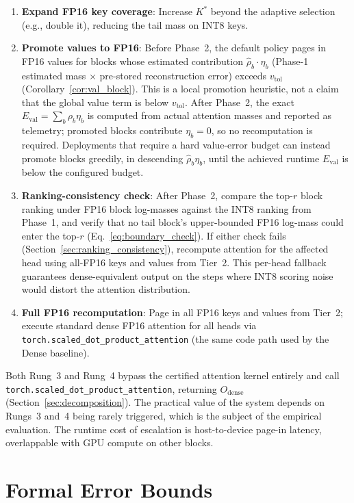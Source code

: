\documentclass[11pt,a4paper]{article}
\theoremstyle{definition}
\theoremstyle{remark}
\newcommand{\torchsdpa}{\texttt{torch.scaled\_dot\_\hspace{0pt}product\_attention}}
\begin{document}
\begin{enumerate}[leftmargin=2em,itemsep=2pt]
  \item \textbf{Expand FP16 key coverage}: Increase $K^*$ beyond the adaptive selection (e.g., double it), reducing the tail mass on INT8 keys.
  \item \textbf{Promote values to FP16}: Before Phase~2, the default policy pages in FP16 values for blocks whose estimated contribution $\hat{\rho}_b \cdot \eta_b$ (Phase-1 estimated mass $\times$ pre-stored reconstruction error) exceeds $v_{\mathrm{tol}}$ (Corollary~\ref{cor:val_block}).  This is a local promotion heuristic, not a claim that the global value term is below $v_{\mathrm{tol}}$.  After Phase~2, the exact $E_{\mathrm{val}} = \sum_b \rho_b \eta_b$ is computed from actual attention masses and reported as telemetry; promoted blocks contribute $\eta_b{=}0$, so no recomputation is required.  Deployments that require a hard value-error budget can instead promote blocks greedily, in descending $\hat{\rho}_b\eta_b$, until the achieved runtime $E_{\mathrm{val}}$ is below the configured budget.
  \item \textbf{Ranking-consistency check}: After Phase~2, compare the top-$r$ block ranking under FP16 block log-masses against the INT8 ranking from Phase~1, and verify that no tail block's upper-bounded FP16 log-mass could enter the top-$r$ (Eq.~\ref{eq:boundary_check}).  If either check fails (Section~\ref{sec:ranking_consistency}), recompute attention for the affected head using all-FP16 keys and values from Tier~2.  This per-head fallback guarantees dense-equivalent output on the steps where INT8 scoring noise would distort the attention distribution.
  \item \textbf{Full FP16 recomputation}: Page in all FP16 keys and values from Tier~2; execute standard dense FP16 attention for all heads via \torchsdpa{} (the same code path used by the Dense baseline).
\end{enumerate}

Both Rung~3 and Rung~4 bypass the certified attention kernel entirely and call \torchsdpa{}, returning $O_{\mathrm{dense}}$ (Section~\ref{sec:decomposition}).  The practical value of the system depends on Rungs~3 and~4 being rarely triggered, which is the subject of the empirical evaluation.  The runtime cost of escalation is host-to-device page-in latency, overlappable with GPU compute on other blocks.


\section{Formal Error Bounds}
\label{sec:bounds}
\end{document}
